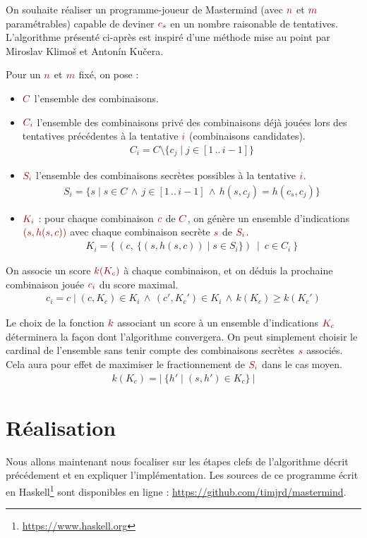 \documentclass[a4paper]{article}
\newcommand{\isep}{\,..\,}
\renewcommand{\(}{\begin{math}\color{brick}}
\renewcommand{\)}{\end{math}}
\newcommand{\blockmath}[1]{{\color{brick}\begin{align*}#1\end{align*}}}
\newcommand{\nblockmath}[1]{{\color{brick}\begin{align}#1\end{align}}}
\newcommand{\lnd}{\,\land\,}
\begin{document}
On souhaite réaliser un programme-joueur de Mastermind (avec \(n\) et \(m\) paramétrables) capable de deviner \(c_s\) en un nombre raisonable de tentatives. L'algorithme présenté ci-après est inspiré d'une méthode\cite{sat} mise au point par Miroslav Klimoš et Antonín Kučera.

Pour un \(n\) et \(m\) fixé, on pose :

\begin{itemize}
  
\item \(C\) l'ensemble des combinaisons.
\item \(C_i\) l'ensemble des combinaisons privé des combinaisons déjà jouées lors des tentatives précédentes à la tentative \(i\) (combinaisons candidates).
  \blockmath{
    C_i = C \setminus \{c_j \mid j \in [1 \isep i-1]\}
  }

\item \(S_i\) l'ensemble des combinaisons secrètes possibles à la tentative \(i\).
  \nblockmath{ \label{pred}
    S_i = \{s \mid s \in C \lnd j \in [1 \isep i-1] \lnd h(s,c_j) = h(c_s,c_j)\}
  }

\item \(K_i\) : pour chaque combinaison \(c\) de \(C\), on génère un ensemble d'indications \((s,h(s,c))\) avec chaque combinaison secrète \(s\) de \(S_i\).
  \nblockmath{ \label{prod}
    K_i = \{ \ (c, \ \{(s,h(s,c)) \mid s \in S_i\}) \ \mid \ c \in C_i \ \}
  }
  
\end{itemize}

On associe un score \(k(K_c)\) à chaque combinaison, et on déduis la prochaine combinaison jouée \(c_i\) du score maximal.
\blockmath{
  c_i = c \mid (c,K_c) \in K_i \lnd (c',K_c') \in K_i \lnd k(K_c) \geq k(K_c')
}

Le choix de la fonction \(k\) associant un score à un ensemble d'indications \(K_c\) déterminera la façon dont l'algorithme convergera. On peut simplement choisir le cardinal de l'ensemble sans tenir compte des combinaisons secrètes \(s\) associés. Cela aura pour effet de maximiser le fractionnement de \(S_i\) dans le cas moyen.
\blockmath{
  k(K_c) = | \ \{ h' \mid (s,h') \in K_c\} \ |
}


\section{Réalisation}

Nous allons maintenant nous focaliser sur les étapes clefs de l'algorithme décrit précédement et en expliquer l'implémentation. Les sources de ce programme écrit en Haskell\footnote{\url{https://www.haskell.org}} sont disponibles en ligne : \url{https://github.com/timjrd/mastermind}.
\end{document}
